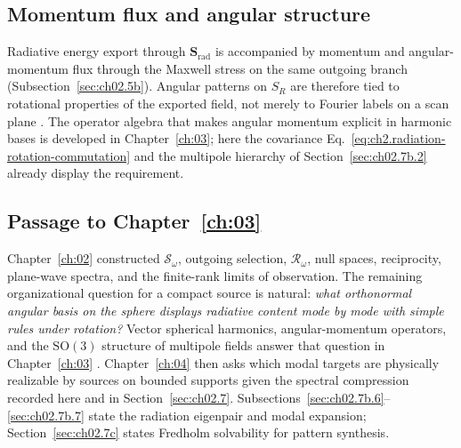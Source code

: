 \subsection{Momentum flux and angular structure}
\label{sec:ch02.7b.4}

Radiative energy export through $\mathbf{S}_{\mathrm{rad}}$ is accompanied by momentum and angular-momentum flux through the Maxwell stress on the same outgoing branch (Subsection~\ref{sec:ch02.5b}). Angular patterns on $S_R$ are therefore tied to rotational properties of the exported field, not merely to Fourier labels on a scan plane \cite{stratton1941}. The operator algebra that makes angular momentum explicit in harmonic bases is developed in Chapter~\ref{ch:03}; here the covariance Eq.~\eqref{eq:ch2.radiation-rotation-commutation} and the multipole hierarchy of Section~\ref{sec:ch02.7b.2} already display the requirement.

\subsection{Passage to Chapter~\ref{ch:03}}
\label{sec:ch02.7b.5}

Chapter~\ref{ch:02} constructed $\mathcal{S}_\omega$, outgoing selection, $\mathcal{R}_\omega$, null spaces, reciprocity, plane-wave spectra, and the finite-rank limits of observation. The remaining organizational question for a compact source is natural: \emph{what orthonormal angular basis on the sphere displays radiative content mode by mode with simple rules under rotation?} Vector spherical harmonics, angular-momentum operators, and the $\mathrm{SO}(3)$ structure of multipole fields answer that question in Chapter~\ref{ch:03} \cite{stratton1941,harrington2001}. Chapter~\ref{ch:04} then asks which modal targets are physically realizable by sources on bounded supports given the spectral compression recorded here and in Section~\ref{sec:ch02.7}. Subsections~\ref{sec:ch02.7b.6}--\ref{sec:ch02.7b.7} state the radiation eigenpair and modal expansion; Section~\ref{sec:ch02.7c} states Fredholm solvability for pattern synthesis.
